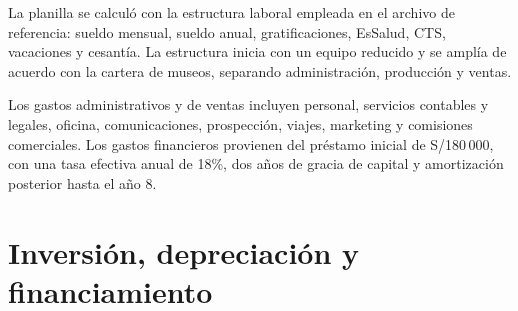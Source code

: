 La planilla se calculó con la estructura laboral empleada en el archivo de referencia: sueldo mensual, sueldo anual, gratificaciones, EsSalud, CTS, vacaciones y cesantía. La estructura inicia con un equipo reducido y se amplía de acuerdo con la cartera de museos, separando administración, producción y ventas.

\begin{table}[H]
	\centering
	\scriptsize
	\mqiTableSetup
	\caption[Planilla por área del proyecto]{Planilla por área usada en el flujo de caja del proyecto. Fuente: hoja \texttt{PLANILLA}.}
	\label{tab:planilla-area-proyecto}
\end{table}

Los gastos administrativos y de ventas incluyen personal, servicios contables y legales, oficina, comunicaciones, prospección, viajes, marketing y comisiones comerciales. Los gastos financieros provienen del préstamo inicial de S/180\,000, con una tasa efectiva anual de 18\%, dos años de gracia de capital y amortización posterior hasta el año 8.

\section{Inversión, depreciación y financiamiento}

